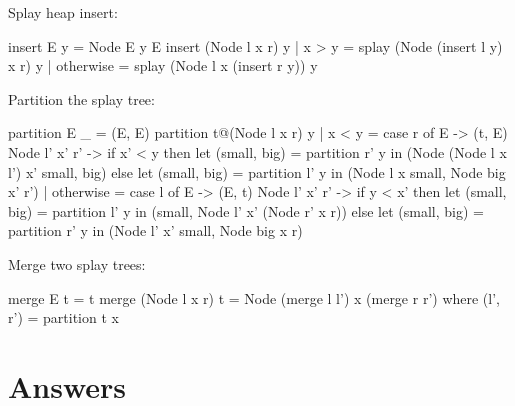 \documentclass[b5paper]{article}
\begin{document}
Splay heap insert:

\begin{Haskell}
insert E y = Node E y E
insert (Node l x r) y
    | x > y     = splay (Node (insert l y) x r) y
    | otherwise = splay (Node l x (insert r y)) y
\end{Haskell}

Partition the splay tree:

\begin{Haskell}
partition E _ = (E, E)
partition t@(Node l x r) y
    | x < y =
        case r of
          E -> (t, E)
          Node l' x' r' ->
              if x' < y then
                  let (small, big) = partition r' y in
                  (Node (Node l x l') x' small, big)
              else
                  let (small, big) = partition l' y in
                  (Node l x small, Node big x' r')
    | otherwise =
        case l of
          E -> (E, t)
          Node l' x' r' ->
              if y < x' then
                  let (small, big) = partition l' y in
                  (small, Node l' x' (Node r' x r))
              else
                  let (small, big) = partition r' y in
                  (Node l' x' small, Node big x r)
\end{Haskell}

Merge two splay trees:

\begin{Haskell}
merge E t = t
merge (Node l x r) t = Node (merge l l') x (merge r r')
    where (l', r') = partition t x
\end{Haskell}

\ifx\wholebook\relax \else
\section{Answers}
\shipoutAnswer
\end{document}

